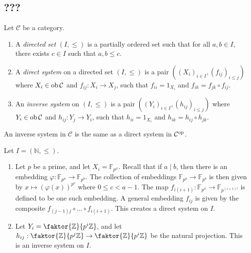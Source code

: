 \subsection{???}
\begin{definition}
    Let \( \mathcal C \) be a category.
    \begin{enumerate}
        \item A \emph{directed set} \( (I, \leq) \) is a partially ordered set such that for all \( a, b \in I \), there exists \( c \in I \) such that \( a, b \leq c \).
        \item A \emph{direct system} on a directed set \( (I, \leq) \) is a pair \( ((X_i)_{i \in I}, (f_{ij})_{i \leq j}) \) where \( X_i \in \operatorname{ob} \mathcal C \) and \( f_{ij} : X_i \to X_j \), such that \( f_{ii} = 1_{X_i} \) and \( f_{ik} = f_{jk} \circ f_{ij} \).
        \item An \emph{inverse system} on \( (I, \leq) \) is a pair \( ((Y_i)_{i \in I}, (h_{ij})_{i \leq j}) \) where \( Y_i \in \operatorname{ob} \mathcal C \) and \( h_{ij} : Y_j \to Y_i \), such that \( h_{ii} = 1_{X_i} \) and \( h_{ik} = h_{ij} \circ h_{jk} \).
    \end{enumerate}
\end{definition}
\begin{remark}
    An inverse system in \( \mathcal C \) is the same as a direct system in \( \mathcal C^{\mathrm{op}} \).
\end{remark}
\begin{example}
    Let \( I = (\mathbb N, \leq) \).
    \begin{enumerate}
        \item Let \( p \) be a prime, and let \( X_i = \mathbb F_{p^{i!}} \).
        Recall that if \( a \mid b \), then there is an embedding \( \varphi : \mathbb F_{p^a} \to \mathbb F_{p^b} \).
        The collection of embeddings \( \mathbb F_{p^a} \to \mathbb F_{p^b} \) is then given by \( x \mapsto (\varphi(x))^{p^c} \) where \( 0 \leq c < a - 1 \).
        The map \( f_{i(i+1)} : \mathbb F_{p^{i!}} \to \mathbb F_{p^{(i+1)!}} \) is defined to be one such embedding.
        A general embedding \( f_{ij} \) is given by the composite \( f_{(j-1)j} \circ \dots \circ f_{i(i+1)} \).
        This creates a direct system on \( I \).
        \item Let \( Y_i = \faktor{\mathbb Z}{p^i \mathbb Z} \), and let \( h_{ij} : \faktor{\mathbb Z}{p^j \mathbb Z} \to \faktor{\mathbb Z}{p^i \mathbb Z} \) be the natural projection.
        This is an inverse system on \( I \).
    \end{enumerate}
\end{example}

